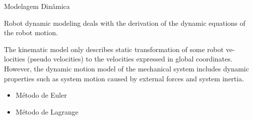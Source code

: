 \documentclass{beamer}
\begin{document}
\begin{frame}{Modelagem Dinâmica}

    Robot dynamic modeling deals with the derivation of the dynamic equations of the robot motion.

    \begin{block}{}
        The kinematic model only describes static transformation of some robot ve-
        locities (pseudo velocities) to the velocities expressed in global coordinates.
        However, the dynamic motion model of the mechanical system includes
        dynamic properties such as system motion caused by external forces and
        system inertia.
    \end{block}

    \begin{itemize}
        \item Método de Euler
        \item Método de Lagrange 
    \end{itemize}
\end{frame}




\end{document}
